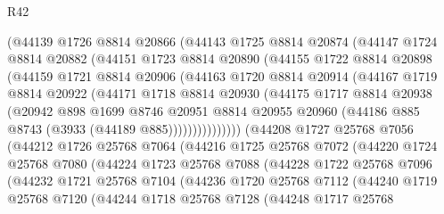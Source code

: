 \begin{lexlean}{R42}
\begin{coremodule}
          (@44139
            @1726
            @8814
            @20866
            (@44143
              @1725
              @8814
              @20874
              (@44147
                @1724
                @8814
                @20882
                (@44151
                  @1723
                  @8814
                  @20890
                  (@44155
                    @1722
                    @8814
                    @20898
                    (@44159
                      @1721
                      @8814
                      @20906
                      (@44163
                        @1720
                        @8814
                        @20914
                        (@44167
                          @1719
                          @8814
                          @20922
                          (@44171
                            @1718
                            @8814
                            @20930
                            (@44175
                              @1717
                              @8814
                              @20938
                              (@20942
                                @898
                                @1699
                                @8746
                                @20951
                                @8814
                                @20955
                                @20960
                                (@44186 @885 @8743 (@3933 (@44189 @885)))))))))))))))
        (@44208
          @1727
          @25768
          @7056
          (@44212
            @1726
            @25768
            @7064
            (@44216
              @1725
              @25768
              @7072
              (@44220
                @1724
                @25768
                @7080
                (@44224
                  @1723
                  @25768
                  @7088
                  (@44228
                    @1722
                    @25768
                    @7096
                    (@44232
                      @1721
                      @25768
                      @7104
                      (@44236
                        @1720
                        @25768
                        @7112
                        (@44240
                          @1719
                          @25768
                          @7120
                          (@44244
                            @1718
                            @25768
                            @7128
                            (@44248
                              @1717
                              @25768

\end{coremodule}
\end{lexlean}

